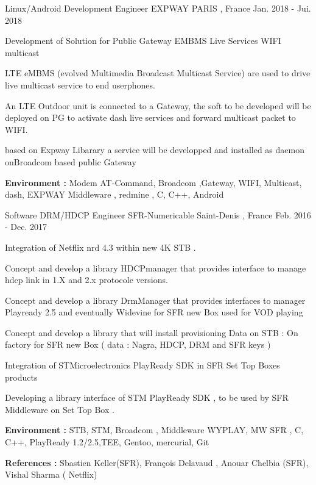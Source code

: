 \begin{cventries}

\cventry
{Linux/Android Development Engineer } %
{EXPWAY} %
{PARIS , France} %
{Jan. 2018 - Jui. 2018} %
{ %
\begin{cvitems}
\item {Development of Solution for Public Gateway EMBMS Live Services WIFI multicast}
\item {LTE eMBMS (evolved Multimedia Broadcast Multicast Service) are used to drive live multicast service to end userphones.}
\item { An LTE  Outdoor unit is connected to a Gateway, the soft to be developed will be deployed on PG to activate dash live services and forward multicast packet to WIFI.}
\item {based on Expway Libarary a service will be developped and installed as daemon onBroadcom based public Gateway}
\item { \textbf{Environment :} Modem AT-Command, Broadcom ,Gateway, WIFI, Multicast, dash, EXPWAY Middleware , redmine , C, C++, Android}
\end{cvitems}
}



\cventry
{Software DRM/HDCP Engineer } %
{SFR-Numericable} %
{Saint-Denis , France} %
{Feb. 2016 - Dec. 2017} %
{ %
\begin{cvitems}
\item {Integration of Netflix nrd 4.3 within new 4K STB .}
\item {Concept and develop a library HDCPmanager that provides interface to manage hdcp link in 1.X and 2.x protocole versions.}
\item {Concept and develop a library DrmManager that provides interfaces to manager Playready 2.5 and eventually Widevine for SFR new Box used for VOD playing }
\item {Concept and develop a library that will install provisioning Data on STB : On factory for SFR new Box ( data : Nagra, HDCP, DRM and SFR keys )}
\item {Integration of STMicroelectronics PlayReady SDK in SFR Set Top Boxes products}
\item {Developing a library interface of STM PlayReady SDK , to be used by SFR Middleware on Set Top Box .}
\item { \textbf{Environment :} STB, STM, Broadcom , Middleware WYPLAY, MW SFR , C, C++, PlayReady 1.2/2.5,TEE, Gentoo, mercurial, Git}
\item { \textbf{References :} Sbastien Keller(SFR), François Delavaud , Anouar Chelbia (SFR), Vishal Sharma ( Netflix)}
\end{cvitems}
}



\end{cventries}
